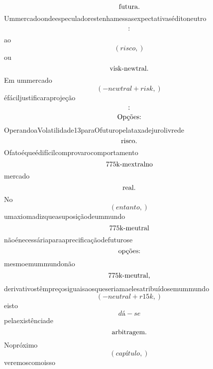 \documentclass{article}
\begin{document}
\begin{equation}
$futura.$
\end{equation}Ummercadoondeespeculadorestenhamessasexpectativaséditoneutro\begin{equation}
$:$
\end{equation}ao\begin{equation}
\left( risco,\right)
\end{equation}ou\begin{equation}
$visk-newtral.$
\end{equation}Em ummercado\begin{equation}
\left( - newtral + risk,\right)
\end{equation}éfáciljustificaraprojeção\begin{equation}
$:$
\end{equation}\begin{equation}
$Opções:$
\end{equation}OperandoaVolatilidade13paraOfuturopelataxadejurolivrede\begin{equation}
$risco.$
\end{equation}Ofatoéqueédifícilcomprovarocomportamento\begin{equation}
$775k-mextralno$
\end{equation}mercado\begin{equation}
$real.$
\end{equation}No\begin{equation}
\left( entanto,\right)
\end{equation}umaxiomadizqueasuposiçãodeummundo\begin{equation}
$775k-meutral$
\end{equation}nãoénecessáriaparaaprecificaçãodefuturose\begin{equation}
$opções:$
\end{equation}mesmoemummundonão\begin{equation}
$775k-meutral,$
\end{equation}derivativostêmpreçosiguaisaosqueseriamaelesatribuídosemummundo\begin{equation}
\left( - neutral + r15k,\right)
\end{equation}eisto\begin{equation}
dá - se
\end{equation}pelaexistênciade\begin{equation}
$arbitragem.$
\end{equation}Nopróximo\begin{equation}
\left( capítulo,\right)
\end{equation}veremoscomoisso\begin{equation}

\end{equation}
\end{document}
